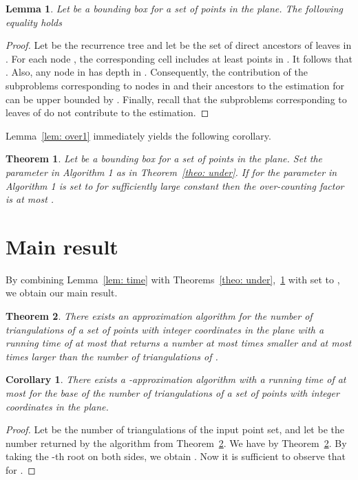 \documentclass[a4paper]{article}
\newtheorem{theorem}{Theorem}
\newtheorem{lemma}{Lemma}
\newtheorem{corollary}{Corollary}
\begin{document}
\begin{lemma}\label{lem: over2}
Let  be a bounding box for a set  of
 points in the plane.
The following equality holds

\end{lemma}
\begin{proof}
Let  be the recurrence tree and let 
be the set of direct ancestors of leaves
in . For each node , the corresponding
 cell includes at least  
points in . It follows that .
Also, any node in  has depth   in .
Consequently, the contribution of the subproblems
corresponding to  nodes in 
and their ancestors to the estimation for 
can be upper bounded by .
Finally, recall that the subproblems corresponding
to leaves of  do not contribute 
to the estimation.
\end{proof}

Lemma~\ref{lem: over1} 
immediately yields
the following corollary.

\begin{theorem}\label{theo: over}
Let  be a bounding box for a set of
 points in the plane.
Set the parameter  in Algorithm 1
as in Theorem~\ref{theo: under}.
If for 
the parameter  in Algorithm 1
is set to 
for sufficiently large constant  then
the over-counting factor is at most
.
\end{theorem}

\section{Main result}

By combining Lemma~\ref{lem: time}
with Theorems~\ref{theo: under},~\ref{theo: over} with 
set to , we obtain
our main result.


\begin{theorem}\label{theo: main}
There exists an approximation
algorithm for 
the number of triangulations of a set 
of  points with integer coordinates in the plane
with a running time of at most
  that returns
a number at most  times
smaller and at most  times
larger than the number of triangulations
of .
\end{theorem}

\begin{corollary}
There exists a -approximation
algorithm with a running time of at most
 for the base
of the number of triangulations of a set
of  points with integer coordinates in the plane.
\end{corollary}
\begin{proof}
Let  be the number of triangulations
of the input  point set, and let 
be the number returned by the algorithm
from Theorem~\ref{theo: main}.
We have 
by Theorem~\ref{theo: main}.
By taking the -th root on both sides, we obtain
.
Now it is sufficient to observe that
 for .
\end{proof}
\end{document}
